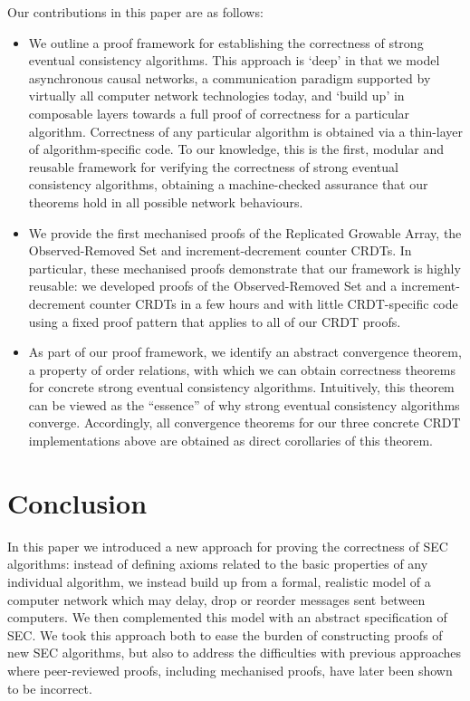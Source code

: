 \documentclass[acmlarge,review,anonymous]{acmart}\settopmatter{printfolios=true}
\begin{document}
Our contributions in this paper are as follows:
\begin{itemize}
\item
We outline a proof framework for establishing the correctness of strong eventual consistency algorithms.
This approach is `deep' in that we model asynchronous causal networks, a communication paradigm supported by virtually all computer network technologies today, and `build up' in composable layers towards a full proof of correctness for a particular algorithm.
Correctness of any particular algorithm is obtained via a thin-layer of algorithm-specific code.
To our knowledge, this is the first, modular and reusable framework for verifying the correctness of strong eventual consistency algorithms, obtaining a machine-checked assurance that our theorems hold in all possible network behaviours.
\item
We provide the first mechanised proofs of the Replicated Growable Array, the Observed-Removed Set and increment-decrement counter CRDTs.
In particular, these mechanised proofs demonstrate that our framework is highly reusable: we developed proofs of the Observed-Removed Set and a increment-decrement counter CRDTs in a few hours and with little CRDT-specific code using a fixed proof pattern that applies to all of our CRDT proofs.
\item
As part of our proof framework, we identify an abstract convergence theorem, a property of order relations, with which we can obtain correctness theorems for concrete strong eventual consistency algorithms.
Intuitively, this theorem can be viewed as the ``essence'' of why strong eventual consistency algorithms converge.
Accordingly, all convergence theorems for our three concrete CRDT implementations above are obtained as direct corollaries of this theorem.
\end{itemize}









\section{Conclusion}
\label{sect.conclusion}

In this paper we introduced a new approach for proving the correctness of SEC algorithms: instead of defining axioms related to the basic properties of any individual algorithm, we instead build up from a formal, realistic model of a computer network which may delay, drop or reorder messages sent between computers.
We then complemented this model with an abstract specification of SEC.
We took this approach both to ease the burden of constructing proofs of new SEC algorithms, but also to address the difficulties with previous approaches where peer-reviewed proofs, including mechanised proofs, have later been shown to be incorrect.
\end{document}
